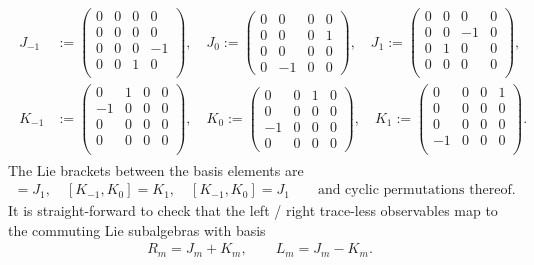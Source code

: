 \documentclass[aps,nofootinbib,floatfix,a4paper]{revtex4}
\newcommand{\1}{\mbox{$\mathbf{1}$}}
\begin{document}
\begin{align}
	\begin{split}\label{eqn:so4basis}
	J_{-1}
	&:=
	\left(
		\begin{array}{cccc}
			0 & 0 & 0 & 0 \\
			0 & 0 & 0 & 0 \\
			0 & 0 & 0 & -1 \\
			0 & 0 & 1 & 0 \\
	 \end{array}
	\right),
	\quad
	J_0
	:=
	\left(
		\begin{array}{cccc}
			0 & 0  & 0 & 0  \\
			0 & 0  & 0 & 1 \\
			0 & 0  & 0 & 0  \\
			0 & -1 & 0 & 0 
	 \end{array}
	\right),
	\quad
	J_1
	:=
	\left(
		\begin{array}{cccc}
			0  & 0 & 0  & 0 \\
			0  & 0 & -1 & 0 \\
			0  & 1 & 0  & 0 \\
			0  & 0 & 0  & 0 \\
	 \end{array}
	\right), \\
	K_{-1}
	&:=
	\left(
		\begin{array}{cccc}
			0  & 1 & 0 & 0 \\
			-1 & 0 & 0 & 0 \\
			0  & 0 & 0 & 0 \\
			0  & 0 & 0 & 0 \\
	 \end{array}
	\right),
	\quad
	K_0
	:=
	\left(
		\begin{array}{cccc}
			0  & 0  & 1 & 0  \\
			0  & 0  & 0 & 0 \\
			-1 & 0  & 0 & 0  \\
			0  & 0  & 0 & 0 
	 \end{array}
	\right),
	\quad
	K_1
	:=
	\left(
		\begin{array}{cccc}
			0  & 0 & 0  & 1 \\
			0  & 0 & 0  & 0 \\
			0  & 0 & 0  & 0 \\
			-1 & 0 & 0  & 0 \\
	 \end{array}
	\right).
	\end{split}
\end{align}
The Lie brackets between the basis elements are
\begin{align*}
	[J_{-1}, J_0] = J_1,
	\quad
	[K_{-1}, K_0] = K_1,
	\quad
	[K_{-1}, K_0]= J_1
	\qquad
	\text{and cyclic permutations thereof}.
\end{align*}
It is straight-forward to check that the left / right trace-less observables map to the commuting Lie subalgebras with basis
%
\begin{align}\label{eqn:local_basis_jk}
	R_m = J_m + K_m,
	\qquad
	L_m = J_m - K_m.
\end{align}
\end{document}
